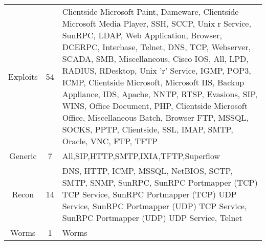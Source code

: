\begin{table}[htbp]
\begin{tabularx}{\textwidth}{@{}ccX@{}}
		Exploits                          & 54                                & Clientside Microsoft Paint, Dameware, Clientside Microsoft Media Player, SSH, SCCP, Unix r Service, SunRPC, LDAP, Web Application, Browser, DCERPC, Interbase, Telnet, DNS, TCP, Webserver, SCADA, SMB, Miscellaneous, Cisco IOS, All, LPD, RADIUS, RDesktop, Unix 'r' Service, IGMP, POP3, ICMP, Clientside Microsoft, Microsoft IIS, Backup Appliance, IDS, Apache, NNTP, RTSP, Evasions, SIP, WINS, Office Document, PHP, Clientside Microsoft Office, Miscellaneous Batch, Browser FTP, MSSQL, SOCKS, PPTP, Clientside, SSL, IMAP, SMTP, Oracle, VNC, FTP, TFTP \\
		Generic                           & 7                                 & All,SIP,HTTP,SMTP,IXIA,TFTP,Superflow                                                                                                                                                                                                                                                                                                                                                                                                                                                                                                                               \\
		Recon                             & 14                                & DNS, HTTP, ICMP, MSSQL, NetBIOS, SCTP, SMTP, SNMP, SunRPC, SunRPC Portmapper (TCP) TCP Service, SunRPC Portmapper (TCP) UDP Service, SunRPC Portmapper (UDP) TCP Service, SunRPC Portmapper (UDP) UDP Service, Telnet                                                                                                                                                                                                                                                                                                                                               \\
		Worms                             & 1                                 & Worms                                                                                                                                                                                                                                                                                                                                                                                                                                                                                                                                                               \\

\end{tabularx}
\end{table}
